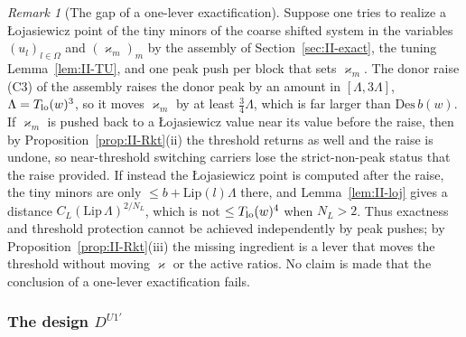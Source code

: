 \documentclass[10pt]{amsart}
\theoremstyle{definition}
\theoremstyle{remark}
\newtheorem{remark}[theorem]{Remark}
\begin{document}
\begin{remark}[The gap of a one-lever exactification]\label{rem:II-onelever}
Suppose one tries to realize a {\L}ojasiewicz point of the tiny minors of the
coarse shifted system in the variables $(u_l)_{l\in\Omega}$ and $(\varkappa_m)_m$ by the
assembly of Section~\ref{sec:II-exact}, the tuning
Lemma~\ref{lem:II-TU}, and one peak push per block that sets $\varkappa_m$.  The
donor raise (C3) of the assembly raises the donor peak by an amount in $[\Lambda,
3\Lambda]$, $\Lambda=T_{\rm lo}(w)^3$, so it moves $\varkappa_m$ by at least $\frac34\Lambda$,
which is far larger than $\mathrm{Des}\,b(w)$.  If $\varkappa_m$ is pushed back to a
{\L}ojasiewicz value near its value before the raise, then by
Proposition~\ref{prop:II-Rkt}(ii) the threshold returns as well and the raise is
undone, so near-threshold switching carriers lose the strict-non-peak status
that the raise provided.  If instead the {\L}ojasiewicz point is computed
after the raise, the tiny minors are only $\le b+\mathrm{Lip}(l)\Lambda$ there, and
Lemma~\ref{lem:II-loj} gives a distance $C_L(\mathrm{Lip}\,\Lambda)^{2/N_L}$, which
is not $\le T_{\rm lo}(w)^4$ when $N_L>2$.  Thus exactness and threshold
protection cannot be achieved independently by peak pushes; by
Proposition~\ref{prop:II-Rkt}(iii) the missing ingredient is a lever that
moves the threshold without moving $\varkappa$ or the active ratios.  No claim is
made that the conclusion of a one-lever exactification fails.
\end{remark}

\subsubsection*{The design $D^{U1'}$}
\end{document}
